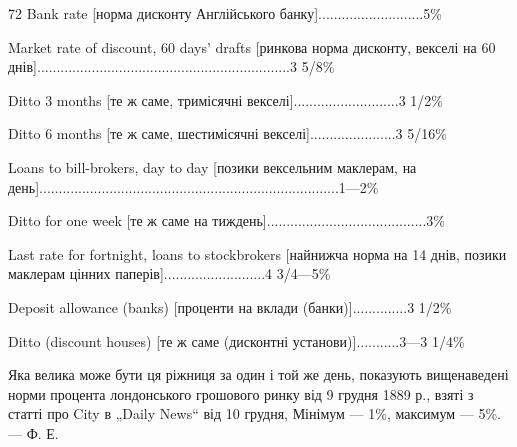 72 Bank rate [норма дисконту Англійського банку]...........................5\%

Market rate of discount, 60 days’ drafts [ринкова норма дисконту,
векселі на 60 днів].................................................................3 5/8\%

Ditto 3 months [те ж саме, тримісячні векселі]...........................3 1/2\%

Ditto 6 months [те ж саме, шестимісячні векселі]......................3 5/16\%

Loans to bill-brokers, day to day [позики вексельним
маклерам, на день].............................................................................1—2\%

Ditto for one week [те ж саме на тиждень].........................................3\%

Last rate for fortnight, loans to stockbrokers [найнижча норма
на 14 днів, позики маклерам цінних паперів]..........................4 3/4—5\%

Deposit allowance (banks) [проценти на вклади (банки)]..............3 1/2\%

Ditto (discount houses) [те ж саме (дисконтні установи)]...........3—3 1/4\%

Яка велика може бути ця ріжниця за один і той же день, показують вищенаведені
норми процента лондонського грошового ринку від 9 грудня 1889 р.,
взяті з статті про City в „Daily News“ від 10 грудня, Мінімум — 1\%, максимум
— 5\%. — Ф. Е.
